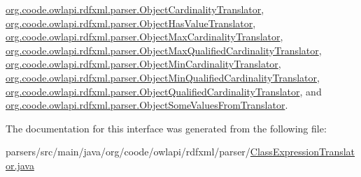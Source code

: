 \hyperlink{classorg_1_1coode_1_1owlapi_1_1rdfxml_1_1parser_1_1_object_cardinality_translator_ab91febf9a10f45a39d9b19c05f462c0c}{org.\-coode.\-owlapi.\-rdfxml.\-parser.\-Object\-Cardinality\-Translator}, \hyperlink{classorg_1_1coode_1_1owlapi_1_1rdfxml_1_1parser_1_1_object_has_value_translator_af859ee0888b1f9b3124bba993df3ad95}{org.\-coode.\-owlapi.\-rdfxml.\-parser.\-Object\-Has\-Value\-Translator}, \hyperlink{classorg_1_1coode_1_1owlapi_1_1rdfxml_1_1parser_1_1_object_max_cardinality_translator_a565b099bcce7279f69474c8cbc84c44d}{org.\-coode.\-owlapi.\-rdfxml.\-parser.\-Object\-Max\-Cardinality\-Translator}, \hyperlink{classorg_1_1coode_1_1owlapi_1_1rdfxml_1_1parser_1_1_object_max_qualified_cardinality_translator_a2c4452d5d1be900b52c73fd61d544218}{org.\-coode.\-owlapi.\-rdfxml.\-parser.\-Object\-Max\-Qualified\-Cardinality\-Translator}, \hyperlink{classorg_1_1coode_1_1owlapi_1_1rdfxml_1_1parser_1_1_object_min_cardinality_translator_a593aff5dc69ac487bdcc6c24ee862599}{org.\-coode.\-owlapi.\-rdfxml.\-parser.\-Object\-Min\-Cardinality\-Translator}, \hyperlink{classorg_1_1coode_1_1owlapi_1_1rdfxml_1_1parser_1_1_object_min_qualified_cardinality_translator_a1d9c8d23bbb6112985da8b78e9590a27}{org.\-coode.\-owlapi.\-rdfxml.\-parser.\-Object\-Min\-Qualified\-Cardinality\-Translator}, \hyperlink{classorg_1_1coode_1_1owlapi_1_1rdfxml_1_1parser_1_1_object_qualified_cardinality_translator_a72098e3aa0b88fd68c830215f019ec88}{org.\-coode.\-owlapi.\-rdfxml.\-parser.\-Object\-Qualified\-Cardinality\-Translator}, and \hyperlink{classorg_1_1coode_1_1owlapi_1_1rdfxml_1_1parser_1_1_object_some_values_from_translator_a6a6b4846a0af30046324f0d84fa54d76}{org.\-coode.\-owlapi.\-rdfxml.\-parser.\-Object\-Some\-Values\-From\-Translator}.



The documentation for this interface was generated from the following file\-:\begin{DoxyCompactItemize}
\item 
parsers/src/main/java/org/coode/owlapi/rdfxml/parser/\hyperlink{_class_expression_translator_8java}{Class\-Expression\-Translator.\-java}\end{DoxyCompactItemize}
